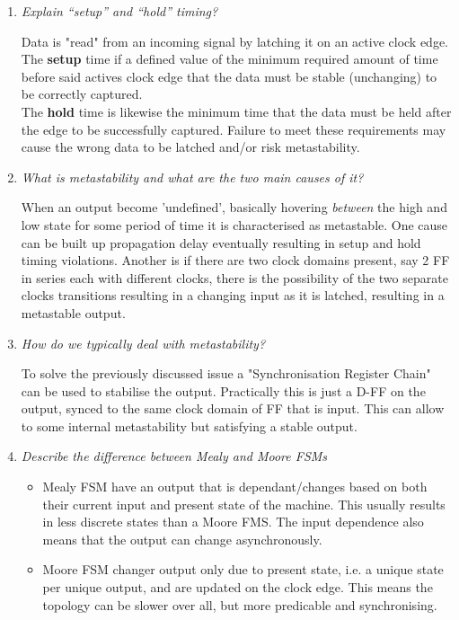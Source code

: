 \documentclass[11pt]{article}
\begin{document}
\begin{preview}
\begin{enumerate}
\begin{enumerate}
        \item \textit{Explain “setup” and “hold” timing?}

        Data is "read" from an incoming signal by latching it on an active clock edge. The \textbf{setup} time if a defined value of the minimum required amount of time before said actives clock edge that the data must be stable (unchanging) to be correctly captured.\\ The \textbf{hold} time is likewise the minimum time that the data must be held after the edge to be successfully captured.  Failure to meet these requirements may cause the wrong data to be latched and/or risk metastability.

    

        \item \textit{What is metastability and what are the two main causes of it?}

        When an output become 'undefined', basically hovering \emph{between} the high and low state for some period of time it is characterised as metastable.
        One cause can be built up propagation delay eventually resulting in setup and hold timing violations.
        Another is if there are two clock domains present, say 2 FF in series each with different clocks, there is the possibility of the two separate clocks transitions resulting in a changing input as it is latched, resulting in a metastable output.


        \item \textit{How do we typically deal with metastability?}

        To solve the previously discussed issue a "Synchronisation Register Chain" can be used to stabilise the output. Practically this is just a D-FF on the output, synced to the same clock domain of FF that is input. This can allow to some internal metastability but satisfying a stable output. 


        \item \textit{Describe the difference between Mealy and Moore FSMs}
            \begin{itemize}
                \item Mealy FSM have an output that is dependant/changes based on both their current input and present state of the machine. This usually results in less discrete states than a Moore FMS. The input dependence also means that the output can change asynchronously.
                \item Moore FSM changer output only due to present state, i.e. a unique state per unique output, and are updated on the clock edge. This means the topology can be slower over all, but more predicable and synchronising.
            \end{itemize}



\end{enumerate}
\end{enumerate}
\end{preview}
\end{document}

